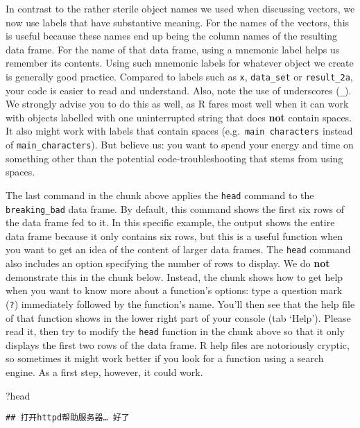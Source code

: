 \documentclass[
]{article}
\newenvironment{Shaded}{\begin{snugshade}}{\end{snugshade}}
\newcommand{\NormalTok}[1]{#1}
\begin{document}
In contrast to the rather sterile object names we used when discussing
vectors, we now use labels that have substantive meaning. For the names
of the vectors, this is useful because these names end up being the
column names of the resulting data frame. For the name of that data
frame, using a mnemonic label helps us remember its contents. Using such
mnemonic labels for whatever object we create is generally good
practice. Compared to labels such as \texttt{x}, \texttt{data\_set} or
\texttt{result\_2a}, your code is easier to read and understand. Also,
note the use of underscores (\texttt{\_}). We strongly advise you to do
this as well, as R fares most well when it can work with objects
labelled with one uninterrupted string that does \textbf{not} contain
spaces. It also might work with labels that contain spaces
(e.g.~\texttt{main\ characters} instead of \texttt{main\_characters}).
But believe us: you want to spend your energy and time on something
other than the potential code-troubleshooting that stems from using
spaces.

The last command in the chunk above applies the \texttt{head} command to
the \texttt{breaking\_bad} data frame. By default, this command shows
the first six rows of the data frame fed to it. In this specific
example, the output shows the entire data frame because it only contains
six rows, but this is a useful function when you want to get an idea of
the content of larger data frames. The \texttt{head} command also
includes an option specifying the number of rows to display. We do
\textbf{not} demonstrate this in the chunk below. Instead, the chunk
shows how to get help when you want to know more about a function's
options: type a question mark (\texttt{?}) immediately followed by the
function's name. You'll then see that the help file of that function
shows in the lower right part of your console (tab `Help'). Please read
it, then try to modify the \texttt{head} function in the chunk above so
that it only displays the first two rows of the data frame. R help files
are notoriously cryptic, so sometimes it might work better if you look
for a function using a search engine. As a first step, however, it could
work.

\begin{Shaded}
\begin{Highlighting}[]
\NormalTok{?head}
\end{Highlighting}
\end{Shaded}

\begin{verbatim}
## 打开httpd帮助服务器… 好了
\end{verbatim}
\end{document}
